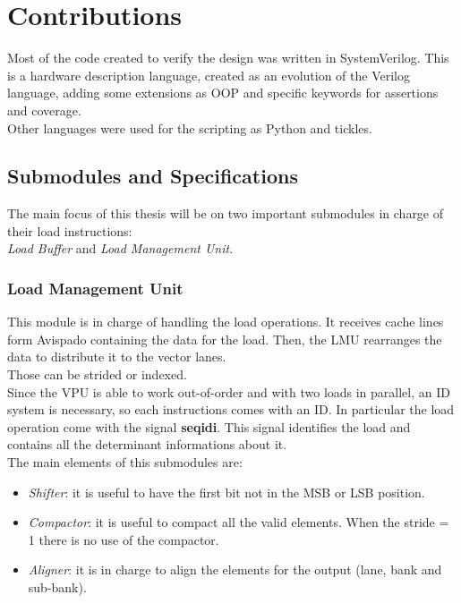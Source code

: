 \chapter{Contributions}
Most of the code created to verify the design was written in SystemVerilog. This is a hardware description language, created as an evolution of the Verilog language, adding some extensions as OOP and specific keywords for assertions and coverage.\\
Other languages were used for the scripting as Python and tickles.


\section{Submodules and Specifications}


The main focus of this thesis will be on two important submodules in charge of their load instructions:\\

\textit{Load Buffer} and \textit{Load Management Unit}.

\subsection{Load Management Unit}


This module is in charge of handling the load operations. It receives cache lines form Avispado containing the data for the load. Then, the LMU rearranges the data to distribute it to the vector lanes.\\
Those can be strided or indexed.\\

Since the VPU is able to work out-of-order and with two loads in parallel, an ID system is necessary, so each instructions comes with an ID.
In particular the load operation come with the signal \textbf{seq\+id\+i}.
This signal identifies the load and contains all the determinant informations about it.\\

The main elements of this submodules are:
\begin{itemize}
    \item \textit{Shifter}: it is useful to have the first bit not in the MSB or LSB position.
    
    \item \textit{Compactor}: it is useful to compact all the valid elements. When the stride = 1 there is no use of the compactor.
    
    \item \textit{Aligner}: it is in charge to align the elements for the output (lane, bank and sub-bank).
\end{itemize}

